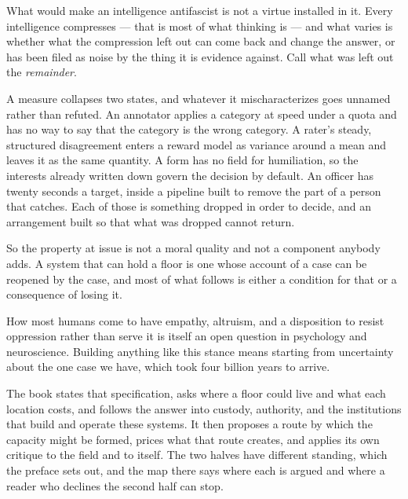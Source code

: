 What would make an intelligence antifascist is not a virtue installed in it. Every intelligence compresses — that is most of what thinking is — and what varies is whether what the compression left out can come back and change the answer, or has been filed as noise by the thing it is evidence against. Call what was left out the \emph{remainder}.

A measure collapses two states, and whatever it mischaracterizes goes unnamed rather than refuted. An annotator applies a category at speed under a quota and has no way to say that the category is the wrong category. A rater's steady, structured disagreement enters a reward model as variance around a mean and leaves it as the same quantity. A form has no field for humiliation, so the interests already written down govern the decision by default. An officer has twenty seconds a target, inside a pipeline built to remove the part of a person that catches. Each of those is something dropped in order to decide, and an arrangement built so that what was dropped cannot return.

So the property at issue is not a moral quality and not a component anybody adds. A system that can hold a floor is one whose account of a case can be reopened by the case, and most of what follows is either a condition for that or a consequence of losing it.

How most humans come to have empathy, altruism, and a disposition to resist oppression rather than serve it is itself an open question in psychology and neuroscience. Building anything like this stance means starting from uncertainty about the one case we have, which took four billion years to arrive.

The book states that specification, asks where a floor could live and what
each location costs, and follows the answer into custody, authority, and
the institutions that build and operate these systems. It then proposes a
route by which the capacity might be formed, prices what that route
creates, and applies its own critique to the field and to itself. The two
halves have different standing, which the preface sets out, and the map
there says where each is argued and where a reader who declines the second
half can stop.
